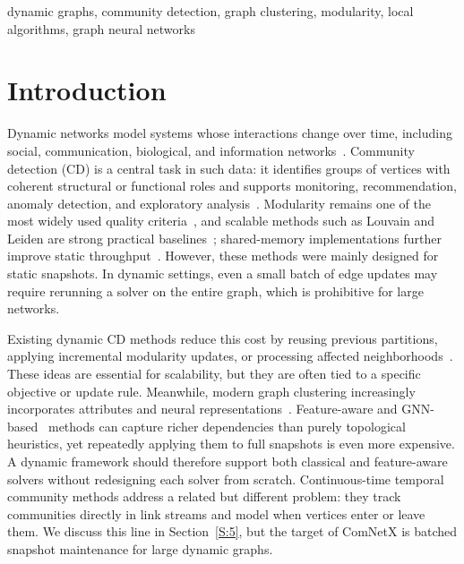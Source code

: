 \documentclass[conference]{IEEEtran}
\theoremstyle{definition}
\begin{document}
\begin{IEEEkeywords}
dynamic graphs, community detection, graph clustering, modularity, local
algorithms, graph neural networks
\end{IEEEkeywords}


\section{Introduction}
Dynamic networks model systems whose interactions change over time, including social, communication, biological, and information networks~\cite{OSH07,PBV07,RC17}. Community detection (CD) is a central task in such data: it identifies groups of vertices with coherent structural or functional roles and supports monitoring, recommendation, anomaly detection, and exploratory analysis~\cite{POM09,SF09,RCC04,FL02}. Modularity remains one of the most widely used quality criteria~\cite{NG04,BDG08}, and scalable methods such as Louvain and Leiden are strong practical baselines~\cite{BGLL08,TWE19}; shared-memory implementations further improve static throughput~\cite{LHK14,Sah23}. However, these methods were mainly designed for static snapshots. In dynamic settings, even a small batch of edge updates may require rerunning a solver on the entire graph, which is prohibitive for large networks.

Existing dynamic CD methods reduce this cost by reusing previous partitions, applying incremental modularity updates, or processing affected neighborhoods~\cite{RC17,CT13,HKT17,ZCL19,ZK21,SLe24}. These ideas are essential for scalability, but they are often tied to a specific objective or update rule. Meanwhile, modern graph clustering increasingly incorporates attributes and neural representations~\cite{CCL23,ZXY20,DSD24,LXW26,JLL23,TPP23}. Feature-aware and GNN-based~\cite{SGH09} methods can capture richer dependencies than purely topological heuristics, yet repeatedly applying them to full snapshots is even more expensive. A dynamic framework should therefore support both classical and feature-aware solvers without redesigning each solver from scratch.
Continuous-time temporal community methods address a related but different
problem: they track communities directly in link streams and model when
vertices enter or leave them. We discuss this line in Section~\ref{S:5}, but
the target of ComNetX is batched snapshot maintenance for large dynamic graphs.
\end{document}
